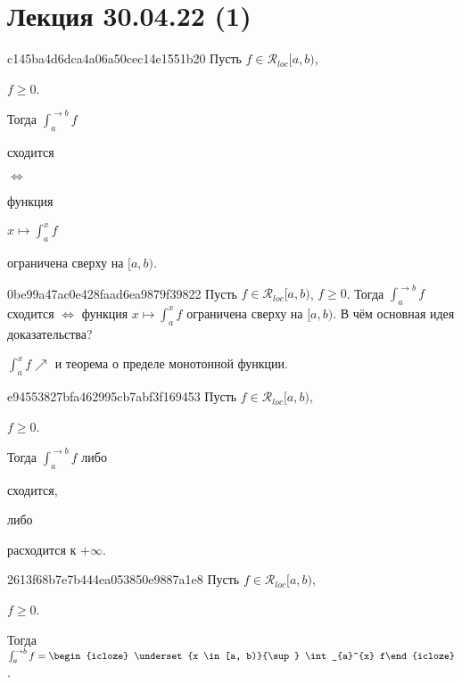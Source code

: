 \section{Лекция 30.04.22 (1)}
\begin{note}{c145ba4d6dca4a06a50cec14e1551b20}
    Пусть \({ f \in \mathcal R_{loc}[a, b) }\), \begin{icloze}{4}\({ f \geqslant 0 }\).\end{icloze}
    Тогда \({ \int_{a}^{\to b} f }\) \begin{icloze}{2}сходится\end{icloze} \begin{icloze}{3}\({ \iff }\)\end{icloze} функция \begin{icloze}{1}\({ x \mapsto \int_{a}^{x} f }\)\end{icloze} ограничена сверху на \({ [a, b) }\).
\end{note}

\begin{note}{0be99a47ac0e428faad6ea9879f39822}
    Пусть \({ f \in \mathcal R_{loc}[a, b) }\), \({ f \geqslant 0 }\).
    Тогда \({ \int_{a}^{\to b} f }\) сходится \({ \iff }\) функция \({ x \mapsto \int_{a}^{x} f }\) ограничена сверху на \({ [a, b) }\).
    В чём основная идея доказательства?

    \begin{cloze}{1}
        \({ \int_{a}^{x} f \!\!\nearrow }\) и теорема о пределе монотонной функции.
    \end{cloze}
\end{note}

\begin{note}{e94553827bfa462995cb7abf3f169453}
    Пусть \({ f \in \mathcal R_{loc}[a, b) }\), \begin{icloze}{2}\({ f \geqslant 0 }\).\end{icloze}
    Тогда \({ \int_{a}^{\to b} f }\) либо \begin{icloze}{1}сходится,\end{icloze} либо \begin{icloze}{1}расходится к \({ +\infty }\).\end{icloze}
\end{note}

\begin{note}{2613f68b7e7b444ea053850e9887a1e8}
    Пусть \({ f \in \mathcal R_{loc}[a, b) }\), \begin{icloze}{2}\({ f \geqslant 0 }\).\end{icloze}
    Тогда \({ \int_{a}^{\to b} f = \begin{icloze}{1}\underset{x \in [a, b)}{\sup} \int_{a}^{x} f\end{icloze} }\).
\end{note}

